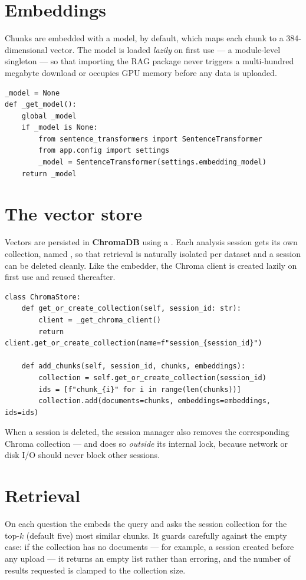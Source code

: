 \section{Embeddings}
Chunks are embedded with a  model,
 by default, which maps each chunk to a 384-dimensional
vector. The model is loaded \emph{lazily} on first use --- a module-level
singleton --- so that importing the RAG package never triggers a multi-hundred
megabyte download or occupies GPU memory before any data is uploaded.

\begin{lstlisting}[style=py,caption={Lazy singleton loading of the embedding model.}]
_model = None
def _get_model():
    global _model
    if _model is None:
        from sentence_transformers import SentenceTransformer
        from app.config import settings
        _model = SentenceTransformer(settings.embedding_model)
    return _model
\end{lstlisting}

\section{The vector store}
Vectors are persisted in \textbf{ChromaDB} using a . Each
analysis session gets its own collection, named , so that
retrieval is naturally isolated per dataset and a session can be deleted
cleanly. Like the embedder, the Chroma client is created lazily on first use and
reused thereafter.

\begin{lstlisting}[style=py,caption={Per-session collections in \code{ChromaStore}.}]
class ChromaStore:
    def get_or_create_collection(self, session_id: str):
        client = _get_chroma_client()
        return client.get_or_create_collection(name=f"session_{session_id}")

    def add_chunks(self, session_id, chunks, embeddings):
        collection = self.get_or_create_collection(session_id)
        ids = [f"chunk_{i}" for i in range(len(chunks))]
        collection.add(documents=chunks, embeddings=embeddings, ids=ids)
\end{lstlisting}

When a session is deleted, the session manager also removes the corresponding
Chroma collection --- and does so \emph{outside} its internal lock, because
network or disk I/O should never block other sessions.

\section{Retrieval}
On each question the  embeds the query and asks the session
collection for the top-$k$ (default five) most similar chunks. It guards
carefully against the empty case: if the collection has no documents --- for
example, a session created before any upload --- it returns an empty list rather
than erroring, and the number of results requested is clamped to the collection
size.

